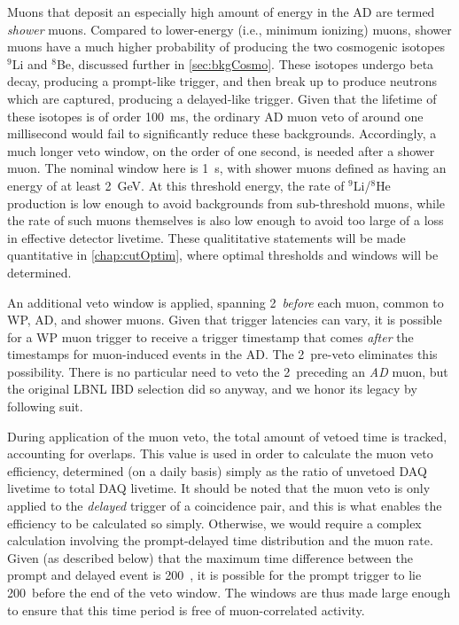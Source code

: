 \documentclass[../thesis.tex]{subfiles}
\begin{document}
Muons that deposit an especially high amount of energy in the AD are termed \emph{shower} muons. Compared to lower-energy (i.e., minimum ionizing) muons, shower muons have a much higher probability of producing the two cosmogenic isotopes $^9$Li and $^8$Be, discussed further in \autoref{sec:bkgCosmo}. These isotopes undergo beta decay, producing a prompt-like trigger, and then break up to produce neutrons which are captured, producing a delayed-like trigger. Given that the lifetime of these isotopes is of order 100~ms, the ordinary AD muon veto of around one millisecond would fail to significantly reduce these backgrounds. Accordingly, a much longer veto window, on the order of one second, is needed after a shower muon. The nominal window here is 1~s, with shower muons defined as having an energy of at least 2~GeV. At this threshold energy, the rate of $^9$Li/$^8$He production is low enough to avoid backgrounds from sub-threshold muons, while the rate of such muons themselves is also low enough to avoid too large of a loss in effective detector livetime. These qualititative statements will be made quantitative in \autoref{chap:cutOptim}, where optimal thresholds and windows will be determined.

An additional veto window is applied, spanning 2~\us \emph{before} each muon, common to WP, AD, and shower muons. Given that trigger latencies can vary, it is possible for a WP muon trigger to receive a trigger timestamp that comes \emph{after} the timestamps for muon-induced events in the AD. The 2~\us pre-veto eliminates this possibility. There is no particular need to veto the 2~\us preceding an \emph{AD} muon, but the original LBNL IBD selection did so anyway, and we honor its legacy by following suit.

During application of the muon veto, the total amount of vetoed time is tracked, accounting for overlaps. This value is used in order to calculate the muon veto efficiency, determined (on a daily basis) simply as the ratio of unvetoed DAQ livetime to total DAQ livetime. It should be noted that the muon veto is only applied to the \emph{delayed} trigger of a coincidence pair, and this is what enables the efficiency to be calculated so simply. Otherwise, we would require a complex calculation involving the prompt-delayed time distribution and the muon rate. Given (as described below) that the maximum time difference between the prompt and delayed event is 200~\us, it is possible for the prompt trigger to lie 200~\us before the end of the veto window. The windows are thus made large enough to ensure that this time period is free of muon-correlated activity.
\end{document}
